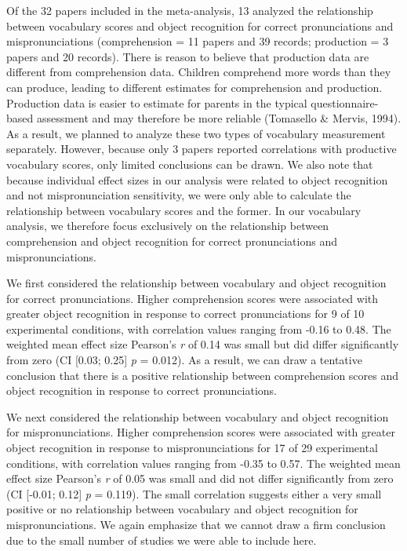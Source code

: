 \documentclass[man]{apa6}
\theoremstyle{definition}
\theoremstyle{definition}
\theoremstyle{definition}
\theoremstyle{remark}
\begin{document}
Of the 32 papers included in the meta-analysis, 13 analyzed the
relationship between vocabulary scores and object recognition for
correct pronunciations and mispronunciations (comprehension = 11 papers
and 39 records; production = 3 papers and 20 records). There is reason
to believe that production data are different from comprehension data.
Children comprehend more words than they can produce, leading to
different estimates for comprehension and production. Production data is
easier to estimate for parents in the typical questionnaire-based
assessment and may therefore be more reliable (Tomasello \& Mervis,
1994). As a result, we planned to analyze these two types of vocabulary
measurement separately. However, because only 3 papers reported
correlations with productive vocabulary scores, only limited conclusions
can be drawn. We also note that because individual effect sizes in our
analysis were related to object recognition and not mispronunciation
sensitivity, we were only able to calculate the relationship between
vocabulary scores and the former. In our vocabulary analysis, we
therefore focus exclusively on the relationship between comprehension
and object recognition for correct pronunciations and mispronunciations.

We first considered the relationship between vocabulary and object
recognition for correct pronunciations. Higher comprehension scores were
associated with greater object recognition in response to correct
pronunciations for 9 of 10 experimental conditions, with correlation
values ranging from -0.16 to 0.48. The weighted mean effect size
Pearson's \emph{r} of 0.14 was small but did differ significantly from
zero (CI {[}0.03; 0.25{]} \emph{p} = 0.012). As a result, we can draw a
tentative conclusion that there is a positive relationship between
comprehension scores and object recognition in response to correct
pronunciations.

We next considered the relationship between vocabulary and object
recognition for mispronunciations. Higher comprehension scores were
associated with greater object recognition in response to
mispronunciations for 17 of 29 experimental conditions, with correlation
values ranging from -0.35 to 0.57. The weighted mean effect size
Pearson's \emph{r} of 0.05 was small and did not differ significantly
from zero (CI {[}-0.01; 0.12{]} \emph{p} = 0.119). The small correlation
suggests either a very small positive or no relationship between
vocabulary and object recognition for mispronunciations. We again
emphasize that we cannot draw a firm conclusion due to the small number
of studies we were able to include here.
\end{document}
